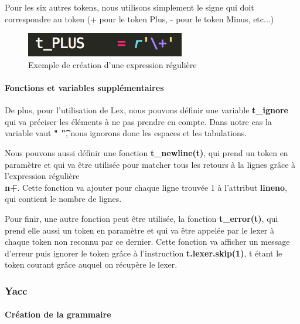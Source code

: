 \documentclass[a4paper,12pt]{article}
\begin{document}
				Pour les six autres tokens, nous utilisons simplement le signe qui doit correspondre au token (+ pour le token Plus, - pour le token Minus, etc...)
			
				\begin{figure}[h!]
					\begin{center}
						\includegraphics[scale=1]{images/exp_regex}
						\caption{Exemple de création d'une expression régulière}
					\end{center}
				\end{figure}


			\paragraph{Fonctions et variables supplémentaires\\}

				De plus, pour l'utilisation de Lex, nous pouvons définir une variable \textbf{t\_ignore} qui va préciser les éléments à ne pas prendre en compte. Dans notre cas la variable vaut \textbf{" \t"}, nous ignorons donc les espaces et les tabulations.

				Nous pouvons aussi définir une fonction \textbf{t\_newline(t)}, qui prend un token en paramètre et qui va être utilisée pour matcher tous les retours à la lignes grâce à l'expression régulière \textbf{\"\\n+\"}. Cette fonction va ajouter pour chaque ligne trouvée 1 à l'attribut \textbf{lineno}, qui contient le nombre de lignes.

				Pour finir, une autre fonction peut être utilisée, la fonction \textbf{t\_error(t)}, qui prend elle aussi un token en paramètre et qui va être appelée par le lexer à chaque token non reconnu par ce dernier. Cette fonction va afficher un message d'erreur puis ignorer le token grâce à l'instruction \textbf{t.lexer.skip(1)}, t étant le token courant grâce auquel on récupère le lexer. 

		\subsubsection{Yacc}

			\paragraph{Création de la grammaire}
\end{document}
